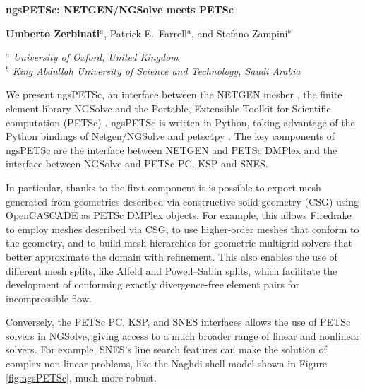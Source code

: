 \documentclass[a4paper,11pt]{article}
\begin{document}

\newpage

\begin{center}
\bgroup
\large
\bf
ngsPETSc: NETGEN/NGSolve meets PETSc
\egroup
\bigskip

\textbf{Umberto Zerbinati}$^a$, Patrick E.~Farrell$^{a}$, and Stefano Zampini$^b$
\medskip

$^a$ {\em University of Oxford, United Kingdom}\\
$^b$ {\em King Abdullah University of Science and Technology, Saudi Arabia}\\
\end{center}
\bigskip

\noindent
We present ngsPETSc, an interface between the NETGEN mesher \cite{netgen}, the finite element library NGSolve \cite{ngsolve} and the Portable, Extensible Toolkit for Scientific computation (PETSc) \cite{petsc}. ngsPETSc is written in Python, taking advantage of the Python bindings of Netgen/NGSolve and petsc4py \cite{petsc4py}.
The key components of ngsPETSc are the interface between NETGEN and PETSc DMPlex and the interface between NGSolve and PETSc PC, KSP and SNES.

In particular, thanks to the first component it is possible to export mesh generated from geometries described via constructive solid geometry (CSG) using OpenCASCADE as PETSc DMPlex objects.
For example, this allows Firedrake \cite{firedrake} to employ meshes described via CSG, to use higher-order meshes that conform to the geometry, and to build mesh hierarchies for geometric multigrid solvers that better approximate the domain with refinement.
This also enables the use of different mesh splits, like Alfeld and Powell--Sabin splits, which facilitate the development of conforming exactly divergence-free element pairs for incompressible flow.

Conversely, the PETSc PC, KSP, and SNES interfaces allows the use of PETSc solvers in NGSolve, giving access to a much broader range of linear and nonlinear solvers.
For example, SNES's line search features can make the solution of complex non-linear problems, like the Naghdi shell model shown in Figure \ref{fig:ngsPETSc}, much more robust.
\end{document}
